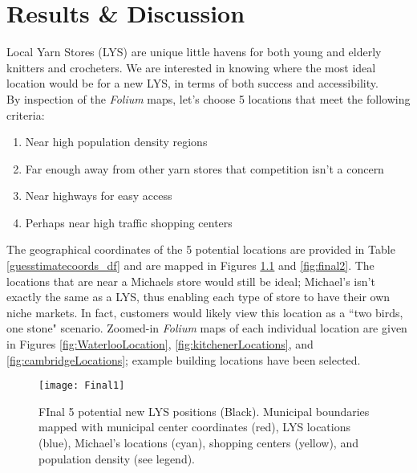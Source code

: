 \documentclass[10pt,a4paper]{report}
\begin{document}
	
	
	\chapter{Results \& Discussion}
	
	Local Yarn Stores (LYS) are unique little havens for both young and elderly knitters and crocheters. We are interested in knowing where the most ideal location would be for a new LYS, in terms of both success and accessibility. \\
	
	\noindent By inspection of the \textit{Folium} maps, let's choose 5 locations that meet the following criteria: 
	
	\begin{enumerate}
		\item Near high population density regions
		\item Far enough away from other yarn stores that competition isn't a concern
		\item Near highways for easy access
		\item Perhaps near high traffic shopping centers
	\end{enumerate}
	
	\noindent The geographical coordinates of the 5 potential locations are provided in Table \ref{guesstimatecoords_df} and are mapped in Figures \ref{fig:final1} and \ref{fig:final2}. The locations that are near a Michaels store would still be ideal; Michael's isn't exactly the same as a LYS, thus enabling each type of store to have their own niche markets. In fact, customers would likely view this location as a ``two birds, one stone" scenario. Zoomed-in \textit{Folium} maps of each individual location are given in Figures \ref{fig:WaterlooLocation}, \ref{fig:kitchenerLocations}, and \ref{fig:cambridgeLocations}; example building locations have been selected.\\

\begin{figure}[h!]
	\centering
	\texttt{[image: Final1]}
	\caption{FInal 5 potential new LYS positions (Black). Municipal boundaries mapped with municipal center coordinates (red), LYS locations (blue), Michael's locations (cyan), shopping centers (yellow), and population density (see legend).}
	\label{fig:final1}
\end{figure}
\end{document}
